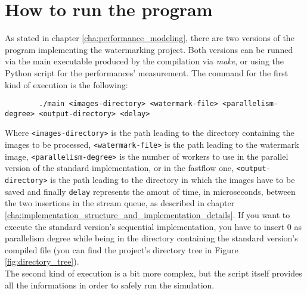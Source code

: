 \chapter{How to run the program} %
\label{cha:how_to_run_the_program}
    As stated in chapter \ref{cha:performance_modeling}, there are two versions of the program implementing
    the watermarking project. Both versions can be runned via the main executable produced by the compilation
    via \textit{make}, or using the Python script for the performances' measurement. The command for the
    first kind of execution is the following:

    \begin{verbatim}
        ./main <images-directory> <watermark-file> <parallelism-degree> <output-directory> <delay>
    \end{verbatim}

    Where \texttt{<images-directory>} is the path leading to the directory containing the images to be processed,
    \texttt{<watermark-file>} is the path leading to the watermark image, \texttt{<parallelism-degree>} is the
    number of workers to use in the parallel version of the standard implementation, or in the fastflow one,
    \texttt{<output-directory>} is the path leading to the directory in which the images have to be saved and
    finally \texttt{delay} represents the amout of time, in microseconds, between the two insertions in the stream
    queue, as described in chapter \ref{cha:implementation_structure_and_implementation_details}.
    If you want to execute the standard version's sequential implementation, you have to insert $0$ as
    parallelism degree while being in the directory containing the standard version's compiled file (you can
    find the project's directory tree in Figure \ref{fig:directory_tree}). \\
    The second kind of execution is a bit more complex, but the script itself provides all the informations
    in order to safely run the simulation.

